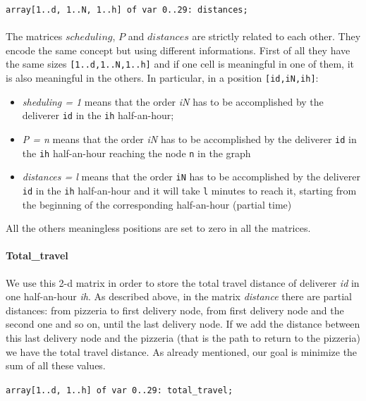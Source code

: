 \documentclass[10pt]{article}
\begin{document}
	\begin{center}
		\texttt{array[1..d, 1..N, 1..h] of var 0..29: distances;}
	\end{center}

	\paragraph*{}
	The matrices $scheduling$, $P$ and $distances$ are strictly related to each other.
	They encode the same concept but using different informations. First of
	all they have the same sizes \texttt{[1..d,1..N,1..h]} and if one cell is meaningful in
	one	of them, it is also meaningful in the others.
	In particular, in a position 
	\texttt{[id,iN,ih]}:
	\begin{itemize}
		\item \textit{sheduling = 1} means that the order \textit{iN} has to be
		accomplished by the deliverer \texttt{id} in the \texttt{ih} half-an-hour;
		\item \textit{P = n} means that the order \textit{iN} has to be
		accomplished by the deliverer \texttt{id} in the \texttt{ih} half-an-hour 
		reaching the node \texttt{n} in the graph
		\item \textit{distances = l} means that the order \texttt{iN} has to be
		accomplished by the deliverer \texttt{id} in the \texttt{ih} half-an-hour 
		and it will take \texttt{l} minutes to reach it, starting from the beginning of the
		corresponding half-an-hour (partial time) 
		 
	\end{itemize}
	All the others meaningless positions are set to zero in all the matrices.

	\paragraph*{Total\_travel}
	We use this 2-d matrix in order to store the total travel distance of deliverer \textit{id} in one half-an-hour \textit{ih}.
	As described above, in the matrix \textit{distance} there are partial distances: from pizzeria to first delivery node, 
	from first delivery node and the second one and so on, until the last delivery node.
	If we add the distance between this last delivery node and the pizzeria (that is the path to return to the pizzeria)
	we have the total travel distance.
	As already mentioned, our goal is minimize the sum of all these values.

	\begin{center}
		\texttt{array[1..d, 1..h] of var 0..29: total\_travel;}
	\end{center}
\end{document}
